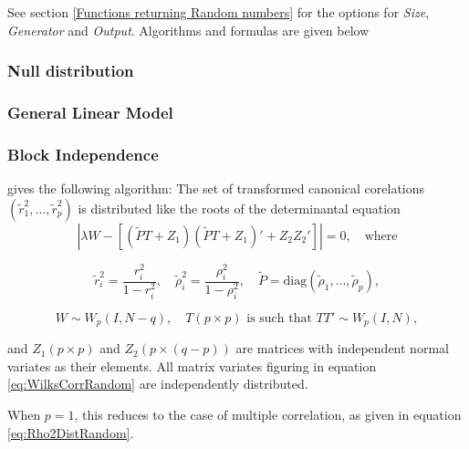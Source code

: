\vspace{0.3cm}

See section \ref{Functions returning Random numbers} for the options for  {\itshape\sffamily Size},  {\itshape\sffamily Generator} and {\itshape\sffamily Output}. Algorithms and formulas are given below


\subsubsection{Null distribution}




\subsubsection{General Linear Model}





\subsubsection{Block Independence}


\cite{lee_distribution_1971} gives the following algorithm:
The set of transformed canonical corelations $(\tilde{r}_1^2,\ldots,\tilde{r}_p^2)$ is distributed like the roots of the determinantal equation
\begin{equation}
	\left|\lambda W - \left[(\tilde{P}T+Z_1)(\tilde{P}T+Z_1)' + Z_2 Z_2'\right]\right| = 0, \quad \text{where} \label{eq:WilksCorrRandom}
\end{equation}

\begin{equation}
	\tilde{r}_i^2 = \frac{r_i^2}{1-r_i^2}, \quad \tilde{\rho}_i^2 = \frac{\rho_i^2}{1-\rho_i^2}, \quad \tilde{P} = \text{diag}(\tilde{\rho}_1,\ldots,\tilde{\rho}_p),
\end{equation}

\begin{equation}
	W \sim W_p(I,N-q), \quad T(p \times p) \text{ is such that } TT' \sim W_p(I,N),
\end{equation}

and $Z_1(p \times p)$ and $Z_2(p \times (q-p))$ are matrices with independent normal variates as their elements. All matrix variates figuring in equation \ref{eq:WilksCorrRandom} are independently distributed.

When $p=1$, this reduces to the case of multiple correlation, as given in equation \ref{eq:Rho2DistRandom}.







